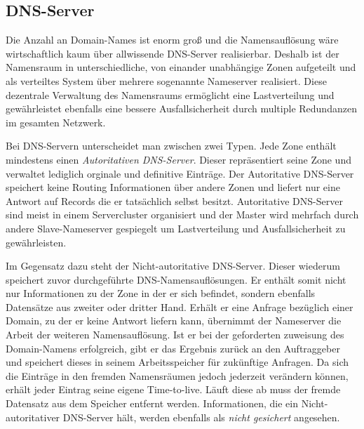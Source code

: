 \subsection{DNS-Server}
Die Anzahl an Domain-Names ist enorm groß und die Namensauflösung wäre wirtschaftlich kaum über allwissende DNS-Server realisierbar. Deshalb ist der Namensraum in unterschiedliche, von einander unabhängige Zonen aufgeteilt und als verteiltes System über mehrere sogenannte Nameserver realisiert. Diese dezentrale Verwaltung des Namensraums ermöglicht eine Lastverteilung und gewährleistet ebenfalls  eine bessere Ausfallsicherheit durch multiple Redundanzen im gesamten Netzwerk. 

Bei DNS-Servern unterscheidet man zwischen zwei Typen. Jede Zone enthält mindestens einen \textit{Autoritativen DNS-Server}. Dieser repräsentiert seine Zone und verwaltet lediglich orginale und definitive Einträge. Der Autoritative DNS-Server speichert keine Routing Informationen über andere Zonen und liefert nur eine Antwort auf Records die er tatsächlich selbst besitzt. Autoritative DNS-Server sind meist in einem Servercluster organisiert und der Master wird mehrfach durch andere Slave-Nameserver gespiegelt um Lastverteilung und Ausfallsicherheit zu gewährleisten. 

Im Gegensatz dazu steht der Nicht-autoritative DNS-Server. Dieser wiederum speichert zuvor durchgeführte DNS-Namensauflösungen. Er enthält somit nicht nur Informationen zu der Zone in der er sich befindet, sondern ebenfalls Datensätze aus zweiter oder dritter Hand. Erhält er eine Anfrage bezüglich einer Domain, zu der er keine Antwort liefern kann, übernimmt der Nameserver die Arbeit der weiteren Namensauflösung. Ist er bei der geforderten zuweisung des Domain-Namens erfolgreich, gibt er das Ergebnis zurück an den Auftraggeber und speichert dieses in seinem Arbeitsspeicher für zukünftige Anfragen. Da sich die Einträge in den fremden Namensräumen jedoch jederzeit verändern können, erhält jeder Eintrag seine eigene Time-to-live. Läuft diese ab muss der fremde Datensatz aus dem Speicher entfernt werden. Informationen, die ein Nicht-autoritativer DNS-Server hält, werden ebenfalls als \textit{nicht gesichert} angesehen. \cite{1und1.2018}

